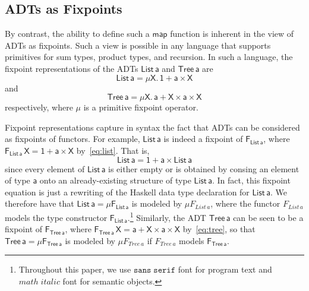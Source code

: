 \documentclass[submission,copyright,creativecommons]{eptcs}
\begin{document}

\subsection{ADTs as Fixpoints} 

By contrast, the ability to define such a $\mathsf{map}$ function is
inherent in the view of ADTs as fixpoints. Such a view is possible in
any language that supports primitives for sum types, product types,
and recursion. In such a language, the fixpoint representations of
  the ADTs $\mathsf{List\,a}$ and $\mathsf{Tree\,a}$ are
\begin{equation}\label{eq:list}
  \mathsf{List\,a} = \mathsf{\mu X.\, 1 + a \times X}
\end{equation}
and 
\begin{equation}\label{eq:tree}
  \mathsf{Tree\,a} = \mathsf{\mu X.\, a + X \times a \times X}
\end{equation}
respectively, where $\mathsf{\mu}$ is a primitive fixpoint operator.

Fixpoint representations capture in syntax the fact that ADTs can be
considered as fixpoints of functors. For example, $\mathsf{List\,a}$ is
indeed a fixpoint of $\mathsf{F_{List\,a}}$, where
$\mathsf{F_{List\,a}\,X} = \mathsf{1 + a \times X}$
by~\eqref{eq:list}. That is,
\[\mathsf{List\,a} = \mathsf{1 + a \times List\,a}\] 
since every element of $\mathsf{List\,a}$ is either empty or is
obtained by consing an element of type $\mathsf{a}$ onto an
already-existing structure of type $\mathsf{List\,a}$. In fact, this
fixpoint equation is just a rewriting of the Haskell data type
declaration for $\mathsf{List\,a}$. We therefore have that
$\mathsf{List\, a} = \mathsf{\mu F_{List\,a}}$ is modeled by $\mu
F_{\mathit{List}\,a}$, where the functor $F_{\mathit{List}\,a}$ models
the type constructor $\mathsf{F_{List\,a}}$.\footnote{Throughout this
  paper, we use $\mathtt{sans\; serif}$ font for program text and
  $\mathit{math \; italic}$ font for semantic objects.}  Similarly,
the ADT $\mathsf{Tree\,a}$ can be seen to be a fixpoint of
$\mathsf{F_{Tree\,a}}$, where $\mathsf{F_{Tree\,a}\,X} = \mathsf{a + X
  \times a \times X}$ by~\eqref{eq:tree}, so that $\mathsf{Tree\, a} =
\mathsf{ \mu F_{Tree\,a}}$ is modeled by $\mu F_{\mathit{Tree}\,a}$ if
$F_{\mathit{Tree}\,a} $ models $\mathsf{F_{Tree\,a}}$.
 
\end{document}
